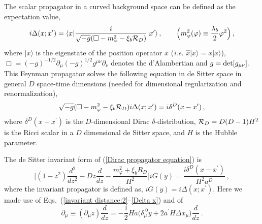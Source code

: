 The scalar propagator in a curved background space
can be defined as the expectation value,
\begin{equation}
 i\Delta(x;x^\prime) = \langle x|
                  \frac{i}{\sqrt{-g}(\Box - m_\varphi^2 - \xi_b{\cal R}_D)}
                  |x^\prime\rangle
\,,\qquad \Big(m_\varphi^2(\varphi)
               \equiv \frac{\lambda_b}{2}\varphi^2\Big)
\,,
\label{de Sitter scalar propagator}
\end{equation}
where $|x\rangle$ is the eigenstate of the position operator $\hat x$
({\it i.e.} $\hat x |x\rangle = x|x\rangle$),
 $\Box=(-g)^{-1/2}\partial_\mu (-g)^{1/2}g^{\mu\nu}\partial_\nu$ denotes
the d'Alambertian and $g={\rm det}[g_{\mu\nu}]$.
This Feynman propagator solves the following equation in de Sitter space
in general $D$ space-time dimensions
(needed for dimensional regularization and renormalization),
\begin{equation}
\sqrt{-g} (\Box - m_\varphi^2 - \xi_b{\cal
R}_D)i\Delta(x;x^\prime)
          = i \delta^D(x-x^\prime)
\,,
\label{Dirac propagator equation}
\end{equation}
where $\delta^D(x-x^\prime)$
is the $D$-dimensional Dirac $\delta$-distribution,
${\cal R}_D = D(D-1)H^2$ is the Ricci scalar in a $D$ dimensional
de Sitter space, and $H$ is the Hubble parameter.

 The de Sitter invariant form of (\ref{Dirac propagator equation})
is~\cite{ChernikovTagirov:1968,Tagirov:1972,BunchDavies:1978,ProkopecPuchwein:2003}
\begin{equation}
     \bigg[
         (1-z^2)\frac{d^2}{dz^2}
       - Dz\frac{d}{dz}
       - \frac{m_\varphi^2+\xi_b R_D}{H^2}
    \bigg]i G(y)
       = \frac{i \delta^D(x-x^\prime)}{H^2 a^{D}}
\,,
\label{dS:scalar propagator}
\end{equation}
where the invariant propagator is defined as, $iG(y) =
i\Delta(x;x^\prime)$. Here we made use of
Eqs.~(\ref{invariant distance:2}--\ref{Delta x}) and of
\begin{equation}
 \partial_\mu \equiv (\partial_\mu z)\frac{d}{dz}
                = - \frac12 Ha\Big(
                                  \delta_\mu^{\;0}y + 2 a^\prime H \Delta x_\mu
                               \Big) \frac{d}{dz}
\,.
\label{partial-mu:z}
\end{equation}

